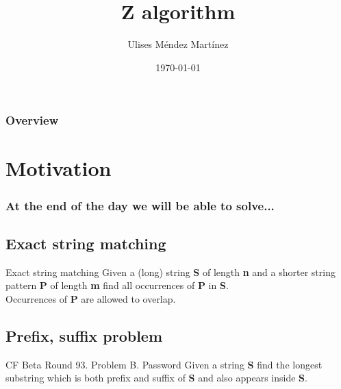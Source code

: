 \documentclass{beamer}
\title[Z algorithm]{Z algorithm} %
\author{Ulises M\'endez Mart\'{i}nez} %
\institute[UTM] %
{
Algorist Weekly Talks \\ %
\medskip
\textit{ulisesmdzmtz@gmail.com} %
}
\date{\today} %
\begin{document}
\begin{frame}
\titlepage %
\end{frame}


\begin{frame}
\frametitle{Overview} %
\tableofcontents %
\end{frame}

\section{Motivation} 

\begin{frame}

\frametitle{ At the end of the day we will be able to solve... }

\subsection{Exact string matching}
\begin{block}{Exact string matching}
Given a (long) string \textbf{S} of length \textbf{n} and a shorter string pattern \textbf{P} of length \textbf{m} find all occurrences of \textbf{P} in \textbf{S}.
\\Occurrences of \textbf{P} are allowed to overlap.
\end{block}

\subsection{Prefix, suffix problem} 

\begin{block}{CF Beta Round 93. Problem B. Password}
Given a string \textbf{S} find the longest substring which is both prefix and suffix of \textbf{S} and also appears inside \textbf{S}.
\end{block}

\end{frame}
\end{document}

